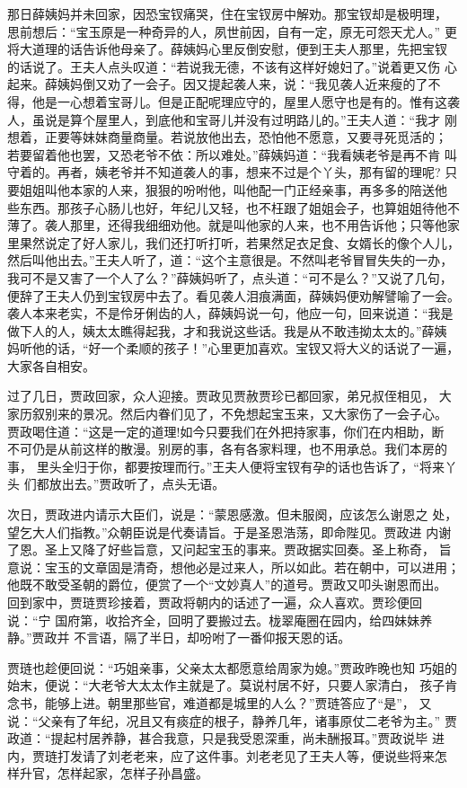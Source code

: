 那日薛姨妈并未回家，因恐宝钗痛哭，住在宝钗房中解劝。那宝钗却是极明理，
思前想后：“宝玉原是一种奇异的人，夙世前因，自有一定，原无可怨天尤人。”
更将大道理的话告诉他母亲了。薛姨妈心里反倒安慰，便到王夫人那里，先把宝钗
的话说了。王夫人点头叹道：“若说我无德，不该有这样好媳妇了。”说着更又伤
心起来。薛姨妈倒又劝了一会子。因又提起袭人来，说：“我见袭人近来瘦的了不
得，他是一心想着宝哥儿。但是正配呢理应守的，屋里人愿守也是有的。惟有这袭
人，虽说是算个屋里人，到底他和宝哥儿并没有过明路儿的。”王夫人道：“我才
刚想着，正要等妹妹商量商量。若说放他出去，恐怕他不愿意，又要寻死觅活的；
若要留着他也罢，又恐老爷不依：所以难处。”薛姨妈道：“我看姨老爷是再不肯
叫守着的。再者，姨老爷并不知道袭人的事，想来不过是个丫头，那有留的理呢?
只要姐姐叫他本家的人来，狠狠的吩咐他，叫他配一门正经亲事，再多多的陪送他
些东西。那孩子心肠儿也好，年纪儿又轻，也不枉跟了姐姐会子，也算姐姐待他不
薄了。袭人那里，还得我细细劝他。就是叫他家的人来，也不用告诉他；只等他家
里果然说定了好人家儿，我们还打听打听，若果然足衣足食、女婿长的像个人儿，
然后叫他出去。”王夫人听了，道：“这个主意很是。不然叫老爷冒冒失失的一办，
我可不是又害了一个人了么？”薛姨妈听了，点头道：“可不是么？”又说了几句，
便辞了王夫人仍到宝钗房中去了。看见袭人泪痕满面，薛姨妈便劝解譬喻了一会。
袭人本来老实，不是伶牙俐齿的人，薛姨妈说一句，他应一句，回来说道：“我是
做下人的人，姨太太瞧得起我，才和我说这些话。我是从不敢违拗太太的。”薛姨
妈听他的话，“好一个柔顺的孩子！”心里更加喜欢。宝钗又将大义的话说了一遍，
大家各自相安。

过了几日，贾政回家，众人迎接。贾政见贾赦贾珍已都回家，弟兄叔侄相见，
大家历叙别来的景况。然后内眷们见了，不免想起宝玉来，又大家伤了一会子心。
贾政喝住道：“这是一定的道理!如今只要我们在外把持家事，你们在内相助，断
不可仍是从前这样的散漫。别房的事，各有各家料理，也不用承总。我们本房的事，
里头全归于你，都要按理而行。”王夫人便将宝钗有孕的话也告诉了，“将来丫头
们都放出去。”贾政听了，点头无语。

次日，贾政进内请示大臣们，说是：“蒙恩感激。但未服阕，应该怎么谢恩之
处，望乞大人们指教。”众朝臣说是代奏请旨。于是圣恩浩荡，即命陛见。贾政进
内谢了恩。圣上又降了好些旨意，又问起宝玉的事来。贾政据实回奏。圣上称奇，
旨意说：宝玉的文章固是清奇，想他必是过来人，所以如此。若在朝中，可以进用；
他既不敢受圣朝的爵位，便赏了一个“文妙真人”的道号。贾政又叩头谢恩而出。
回到家中，贾琏贾珍接着，贾政将朝内的话述了一遍，众人喜欢。贾珍便回说：“宁
国府第，收拾齐全，回明了要搬过去。栊翠庵圈在园内，给四妹妹养静。”贾政并
不言语，隔了半日，却吩咐了一番仰报天恩的话。

贾琏也趁便回说：“巧姐亲事，父亲太太都愿意给周家为媳。”贾政昨晚也知
巧姐的始末，便说：“大老爷大太太作主就是了。莫说村居不好，只要人家清白，
孩子肯念书，能够上进。朝里那些官，难道都是城里的人么？”贾琏答应了“是”，
又说：“父亲有了年纪，况且又有痰症的根子，静养几年，诸事原仗二老爷为主。”
贾政道：“提起村居养静，甚合我意，只是我受恩深重，尚未酬报耳。”贾政说毕
进内，贾琏打发请了刘老老来，应了这件事。刘老老见了王夫人等，便说些将来怎
样升官，怎样起家，怎样子孙昌盛。

